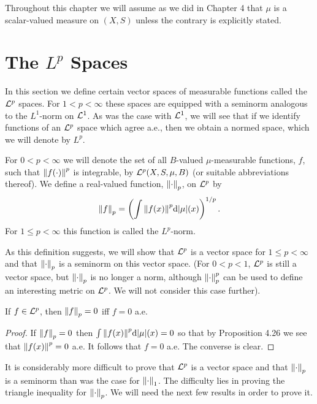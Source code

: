 
Throughout this chapter we will assume as we did in Chapter 4 that $\mu$ is a scalar-valued measure on $(X,S)$ unless the contrary is explicitly stated.

\section{The $L^p$ Spaces}

In this section we define certain vector spaces of measurable functions called the ${\cal L}^p$ spaces. For $1<p<\infty$ these spaces are equipped with a seminorm analogous to the $L^1$-norm on ${\cal L}^1$. As was the case with ${\cal L}^1$, we will see that if we identify functions of an ${\cal L}^p$ space which agree a.e., then we obtain a normed space, which we will denote by $L^p$.

\begin{definition}
For $0<p<\infty$ we will denote the set of all $B$-valued $\mu$-measurable functions, $f$, such that $\norm{f(\cdot)}^p$ is integrable, by ${\cal L}^p(X,S,\mu,B)$ (or suitable abbreviations thereof). We define a real-valued function, $\norm{\cdot}_p$, on ${\cal L}^p$ by $$\norm{f}_p=\left(\int\norm{f(x)}^p\dd|\mu|(x)\right)^{1/p}.$$ For $1\leq p<\infty$ this function is called the $L^p$-norm.
\end{definition}

As this definition suggests, we will show that ${\cal L}^p$ is a vector space for $1 \leq p<\infty$ and that $\norm{\cdot}_p$ is a seminorm on this vector space. (For $0<p<1$, ${\cal L}^p$ is still a vector space, but $\norm{\cdot}_p$ is no longer a norm, although $\norm{\cdot}_p^p$ can be used to define an interesting metric on ${\cal L}^p$. We will not consider this case further).

\begin{proposition}
If $f\in{\cal L}^p$, then $\norm{f}_p=0$ iff $f=0$ a.e.
\end{proposition}

\begin{proof}
If $\norm{f}_p=0$ then $\int\norm{f(x)}^p\dd|\mu|(x)=0$ so that by Proposition 4.26 we see that $\norm{f(x)}^p=0$ a.e. It follows that $f=0$ a.e. The converse is clear.
\end{proof}

It is considerably more difficult to prove that ${\cal L}^p$ is a vector space and that $\norm{\cdot}_p$ is a seminorm than was the case for $\norm{\cdot}_1$. The difficulty lies in proving the triangle inequality for $\norm{\cdot}_p$. We will need the next few results in order to prove it.

